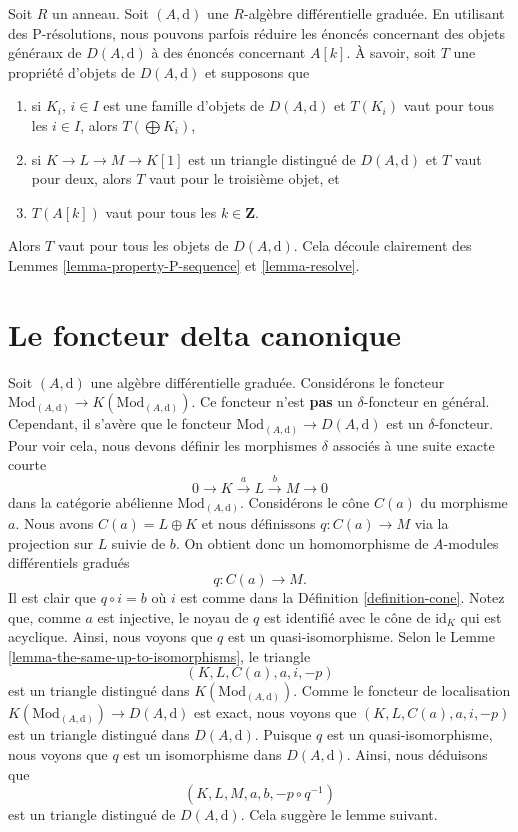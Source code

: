 \begin{remark}
\label{remark-P-resolution}
Soit $R$ un anneau. Soit $(A, \text{d})$ une $R$-algèbre différentielle graduée.
En utilisant des P-résolutions, nous pouvons parfois réduire les énoncés
concernant des objets généraux de $D(A, \text{d})$ à des énoncés concernant
$A[k]$. À savoir, soit $T$ une propriété d'objets de $D(A, \text{d})$ et supposons
que
\begin{enumerate}
\item si $K_i$, $i \in I$ est une famille d'objets de $D(A, \text{d})$ et $T(K_i)$
vaut pour tous les $i \in I$, alors $T(\bigoplus K_i)$,
\item si $K \to L \to M \to K[1]$ est un triangle distingué de $D(A, \text{d})$ et
$T$ vaut pour deux, alors $T$ vaut pour le troisième objet, et
\item $T(A[k])$ vaut pour tous les $k \in \mathbf{Z}$.
\end{enumerate}
Alors $T$ vaut pour tous les objets de $D(A, \text{d})$. Cela découle clairement
des Lemmes \ref{lemma-property-P-sequence} et \ref{lemma-resolve}.
\end{remark}







\section{Le foncteur delta canonique}
\label{section-canonical-delta-functor}

\noindent
Soit $(A, \text{d})$ une algèbre différentielle graduée. Considérons le foncteur
$\text{Mod}_{(A, \text{d})} \to K(\text{Mod}_{(A, \text{d})})$. Ce foncteur n'est
{\bf pas} un $\delta$-foncteur en général. Cependant, il s'avère que le foncteur
$\text{Mod}_{(A, \text{d})} \to D(A, \text{d})$ est un $\delta$-foncteur. Pour
voir cela, nous devons définir les morphismes $\delta$ associés à une suite exacte
courte
$$
0 \to K \xrightarrow{a} L \xrightarrow{b} M \to 0
$$
dans la catégorie abélienne $\text{Mod}_{(A, \text{d})}$. Considérons le cône
$C(a)$ du morphisme $a$. Nous avons $C(a) = L \oplus K$ et nous définissons $q :
C(a) \to M$ via la projection sur $L$ suivie de $b$. On obtient donc un homomorphisme de
$A$-modules différentiels gradués
$$
q : C(a) \longrightarrow M.
$$
Il est clair que $q \circ i = b$ où $i$ est comme dans la Définition
\ref{definition-cone}. Notez que, comme $a$ est injective, le noyau de $q$ est
identifié avec le cône de $\text{id}_K$ qui est acyclique. Ainsi, nous voyons que
$q$ est un quasi-isomorphisme. Selon le Lemme
\ref{lemma-the-same-up-to-isomorphisms}, le triangle
$$
(K, L, C(a), a, i, -p)
$$
est un triangle distingué dans $K(\text{Mod}_{(A, \text{d})})$. Comme le foncteur
de localisation $K(\text{Mod}_{(A, \text{d})}) \to D(A, \text{d})$ est exact, nous
voyons que $(K, L, C(a), a, i, -p)$ est un triangle distingué dans $D(A,
\text{d})$. Puisque $q$ est un quasi-isomorphisme, nous voyons que $q$ est un
isomorphisme dans $D(A, \text{d})$. Ainsi, nous déduisons que
$$
(K, L, M, a, b, -p \circ q^{-1})
$$
est un triangle distingué de $D(A, \text{d})$. Cela suggère le lemme suivant.

